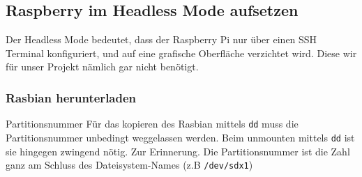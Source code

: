 \subsection{Raspberry im Headless Mode aufsetzen}
Der Headless Mode bedeutet, dass der Raspberry Pi nur über einen SSH Terminal konfiguriert, und auf eine grafische Oberfläche verzichtet wird. Diese wir für unser Projekt nämlich gar nicht benötigt.

\subsubsection{Rasbian herunterladen}
\begin{hint}{Partitionsnummer}{}
Für das kopieren des Rasbian mittels \lstinline|dd| muss die Partitionsnummer unbedingt weggelassen werden. Beim unmounten mittels \lstinline|dd| ist sie hingegen zwingend nötig. Zur Erinnerung. Die Partitionsnummer ist die Zahl ganz am Schluss des Dateisystem-Names (z.B \lstinline|/dev/sdx1|)
\end{hint}

